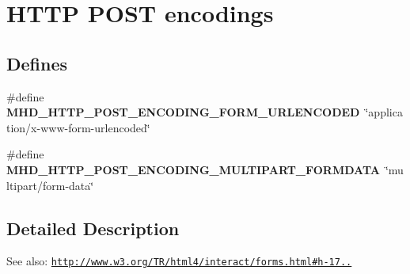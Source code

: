 \hypertarget{group__postenc}{\section{\-H\-T\-T\-P \-P\-O\-S\-T encodings}
\label{group__postenc}
}
\subsection*{\-Defines}
\begin{DoxyCompactItemize}
\item 
\hypertarget{group__postenc_ga91c0ea84504469653abe5a55caa691b0}{\#define {\bfseries \-M\-H\-D\-\_\-\-H\-T\-T\-P\-\_\-\-P\-O\-S\-T\-\_\-\-E\-N\-C\-O\-D\-I\-N\-G\-\_\-\-F\-O\-R\-M\-\_\-\-U\-R\-L\-E\-N\-C\-O\-D\-E\-D}~\char`\"{}application/x-\/www-\/form-\/urlencoded\char`\"{}}\label{group__postenc_ga91c0ea84504469653abe5a55caa691b0}

\item 
\hypertarget{group__postenc_ga07590690778397aa0636cde971cf6e63}{\#define {\bfseries \-M\-H\-D\-\_\-\-H\-T\-T\-P\-\_\-\-P\-O\-S\-T\-\_\-\-E\-N\-C\-O\-D\-I\-N\-G\-\_\-\-M\-U\-L\-T\-I\-P\-A\-R\-T\-\_\-\-F\-O\-R\-M\-D\-A\-T\-A}~\char`\"{}multipart/form-\/data\char`\"{}}\label{group__postenc_ga07590690778397aa0636cde971cf6e63}

\end{DoxyCompactItemize}


\subsection{\-Detailed \-Description}
\-See also\-: \href{http://www.w3.org/TR/html4/interact/forms.html#h-17.13.4}{\tt http\-://www.\-w3.\-org/\-T\-R/html4/interact/forms.\-html\#h-\/17..} 